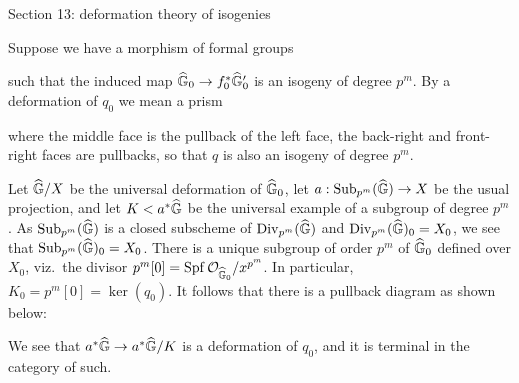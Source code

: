Section 13: deformation theory of isogenies

\begin{definition}
Suppose we have a morphism of formal groups
\begin{center}
\end{center}
such that the induced map $\widehat{\mathbb G}_0 \to f_0^* \widehat{\mathbb G}'_0$ is an isogeny of degree $p^m$.  By a deformation of $q_0$ we mean a prism
\begin{center}
\end{center}
where the middle face is the pullback of the left face, the back-right and front-right faces are pullbacks, so that $q$ is also an isogeny of degree $p^m$.
\end{definition}

Let $\widehat{\mathbb G}/X$ be the universal deformation of $\widehat{\mathbb G}_0$, let $a: \operatorname{Sub}_{p^m}(\widehat{\mathbb G}) \to X$ be the usual projection, and let $K < a^* \widehat{\mathbb G}$ be the universal example of a subgroup of degree $p^m$.  As $\operatorname{Sub}_{p^m}(\widehat{\mathbb G})$ is a closed subscheme of $\operatorname{Div}_{p^m}(\widehat{\mathbb G})$ and $\operatorname{Div}_{p^m}(\widehat{\mathbb G})_0 = X_0$, we see that $\operatorname{Sub}_{p^m}(\widehat{\mathbb G})_0 = X_0$.  There is a unique subgroup of order $p^m$ of $\widehat{\mathbb G}_0$ defined over $X_0$, viz.\ the divisor $p^m[0] = \operatorname{Spf} \mathcal{O}_{\widehat{\mathbb G}_0} / x^{p^m}$.  In particular, $K_0 = p^m[0] = \ker(q_0)$.  It follows that there is a pullback diagram as shown below:
\begin{center}
\end{center}
We see that $a^* \widehat{\mathbb G} \to a^* \widehat{\mathbb G}/K$ is a deformation of $q_0$, and it is terminal in the category of such.

